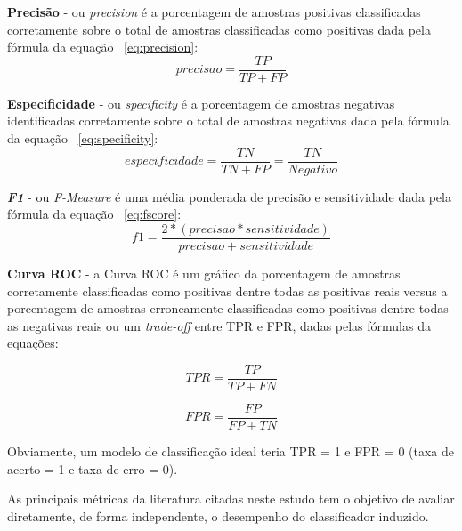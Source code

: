 \textbf{Precisão} - ou \textit{precision} é a porcentagem de amostras positivas classificadas corretamente sobre o total de amostras classificadas como positivas dada pela fórmula da equação ~\ref{eq:precision}:
\begin{equation} \label{eq:precision}
    precisao = \frac{TP}{TP+FP}
\end{equation}

\textbf{Especificidade} - ou \textit{specificity} é a porcentagem de amostras negativas identificadas corretamente sobre o total de amostras negativas dada pela fórmula da equação ~\ref{eq:specificity}:
\begin{equation} \label{eq:specificity}
    especificidade = \frac{TN}{TN+FP}=\frac{TN}{Negativo}
\end{equation}

\textbf{\textit{F1}} - ou \textit{F-Measure} é uma média ponderada de precisão e sensitividade dada pela fórmula da equação ~\ref{eq:fscore}:
\begin{equation} \label{eq:fscore}
    f1=\frac{2*(precisao*sensitividade)}{precisao+sensitividade}
\end{equation}

\textbf{Curva ROC} - a Curva ROC é um gráfico da porcentagem de amostras corretamente classificadas como positivas dentre todas as positivas reais versus a porcentagem de amostras erroneamente classificadas como positivas dentre todas as negativas reais ou um \textit{trade-off} entre TPR e FPR, dadas pelas fórmulas da equações:

\begin{equation} \label{eq:tpr}
    TPR=\frac{TP}{TP+FN}
\end{equation}

\begin{equation} \label{eq:fpr}
    FPR=\frac{FP}{FP+TN}
\end{equation}

Obviamente, um modelo de classificação ideal teria TPR = 1 e FPR = 0 (taxa de acerto = 1 e taxa de erro = 0).

As principais métricas da literatura citadas neste estudo tem o objetivo de avaliar diretamente, de forma independente, o desempenho do classificador induzido.

